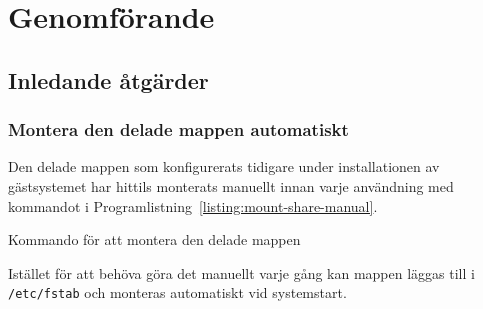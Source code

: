 %
%
%


\section{Genomförande}




\subsection{Inledande åtgärder}

\subsubsection{Montera den delade mappen automatiskt}
Den delade mappen som konfigurerats tidigare under installationen av
gästsystemet har hittils monterats manuellt innan varje användning med
kommandot i Programlistning~\ref{listing:mount-share-manual}.

\begin{listing}[H]
  \caption{Kommando för att montera den delade mappen}
  \label{listing:mount-share-manual}
\end{listing}

Istället för att behöva göra det manuellt varje gång kan mappen läggas till i
\texttt{/etc/fstab} och monteras automatiskt vid systemstart.

